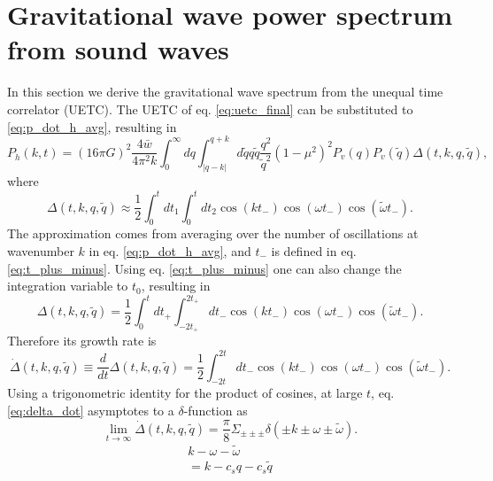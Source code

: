 \section{Gravitational wave power spectrum from sound waves}
\label{gw_from_sound_waves}
In this section we derive the gravitational wave spectrum from the unequal time correlator (UETC).
The UETC of eq. \eqref{eq:uetc_final} can be substituted to \eqref{eq:p_dot_h_avg},
resulting in
\cite[eq. 3.35]{hindmarsh_gw_pt_2019}
\begin{equation}
P_{\dot{h}} (k,t) = (16 \pi G)^2 \frac{4 \bar{w}}{4\pi^2 k}
\int_0^\infty dq \int_{|q-k|}^{q+k} d\tilde{q} q \tilde{q} \frac{q^2}{\tilde{q}^2} (1-\mu^2)^2
P_v(q) P_v(\tilde{q}) \Delta(t,k,q,\tilde{q}),
\end{equation}
where
\begin{equation}
\Delta(t,k,q,\tilde{q}) \approx \frac{1}{2} \int_0^t dt_1 \int_0^t dt_2 \cos(kt_-)\cos(\omega t_-)\cos(\tilde{\omega}t_-).
\end{equation}
The approximation comes from averaging over the number of oscillations at wavenumber $k$ in eq. \eqref{eq:p_dot_h_avg},
and $t_-$ is defined in eq. \eqref{eq:t_plus_minus}.
Using eq. \eqref{eq:t_plus_minus} one can also change the integration variable to $t_0$, resulting in
\begin{equation}
\Delta(t,k,q,\tilde{q}) = \frac{1}{2} \int_0^t dt_+ \int_{-2t_+}^{2t_+} dt_- \cos(kt_-) \cos(\omega t_-) \cos(\tilde{\omega} t_-).
\end{equation}
Therefore its growth rate is
\begin{equation}
\dot{\Delta}(t,k,q,\tilde{q}) \equiv \frac{d}{dt} \Delta(t,k,q,\tilde{q}) = \frac{1}{2} \int_{-2t}^{2t} dt_- \cos(kt_-) \cos(\omega t_-) \cos(\tilde{\omega} t_-).
\label{eq:delta_dot}
\end{equation}
Using a trigonometric identity for the product of cosines,
at large $t$, eq. \eqref{eq:delta_dot} asymptotes to a $\delta$-function as
\begin{equation}
\lim_{t\rightarrow\infty} \dot{\Delta}(t,k,q,\tilde{q}) = \frac{\pi}{8} \Sigma_{\pm\pm\pm} \delta(\pm k \pm \omega \pm \tilde{\omega}).
\end{equation}
\iffalse
\begin{align}
k - \omega - \tilde{\omega} \\
= k - c_s q - c_s \tilde{q} \\
\end{align}
